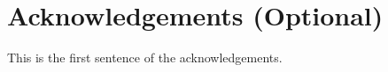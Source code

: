 \documentclass{vie16}
\begin{document}
		
		
		



\section{Acknowledgements (Optional)}

This is the first sentence of the acknowledgements.

%
%
% 
\end{document}
